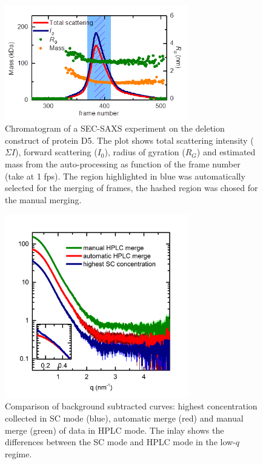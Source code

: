 \documentclass[preprint,pdf]{iucr}              %
\begin{document}
\begin{figure}
\centering
\includegraphics[width=8cm]{sec.png}
\caption{Chromatogram of a SEC-SAXS experiment on the deletion construct of
protein D5.
The plot shows total scattering intensity ($\Sigma I$), forward scattering
($I_0$), radius of gyration ($R_G$) and estimated mass from the
auto-processing as function of the frame number (take at 1 fps).
The region highlighted in blue was automatically selected for the merging of
frames, the hashed region was chosed for the manual merging.}
\label{fgr:SEC}
\end{figure}

\begin{figure}
\centering
\includegraphics[width=8cm]{curves.png}
\caption{Comparison of background subtracted curves: highest concentration
collected in SC mode (blue), automatic merge (red) and manual
merge (green) of data in HPLC mode. 
The inlay shows the differences between the SC mode and HPLC mode in the
low-$q$ regime. }
\label{fgr:curves}
\end{figure}
\end{document}
